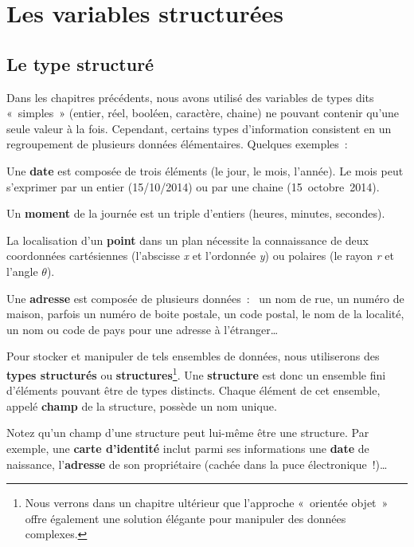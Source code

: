 \chapter{Les variables structurées}

\section{Le type structuré}

	Dans les chapitres précédents, nous avons utilisé des variables de types
	dits «~simples~» (entier, réel, booléen, caractère, chaine) ne pouvant
	contenir qu’une seule valeur à la fois. Cependant, certains types
	d’information consistent en un regroupement de plusieurs données
	élémentaires. Quelques exemples~:

	\begin{liste}
	\item
		Une \textbf{date} est composée de trois éléments (le jour, le mois,
		l’année). Le mois peut s'exprimer par un entier (15/10/2014) 
		ou par une chaine (15~octobre~2014).
	\item
		Un \textbf{moment} de la journée est un triple d’entiers 
		(heures, minutes, secondes).
	\item
		La localisation d’un \textbf{point} dans un plan 
		nécessite la connaissance de deux coordonnées cartésiennes 
		(l’abscisse \textit{x} et l’ordonnée \textit{y}) 
		ou polaires 
		(le rayon \textit{r} et l’angle \textit{$\theta$}).
	\item
		Une \textbf{adresse} est composée de plusieurs données~:~
		un nom de rue, 
		un numéro de maison, 
		parfois un numéro de boite postale, 
		un code postal, 
		le nom de la localité, 
		un nom ou code de pays pour une adresse à l’étranger\dots
	\end{liste}

	Pour stocker et manipuler de tels ensembles de données, nous utiliserons
	des \textbf{types structurés} ou \textbf{structures}\footnote{Nous
	verrons dans un chapitre ultérieur que l’approche
	«~orientée objet~» offre également une solution élégante pour manipuler
	des données complexes.}. Une \textbf{structure} est donc un ensemble
	fini d’éléments pouvant être de types distincts. Chaque élément de cet
	ensemble, appelé \textbf{champ} de la structure, possède un nom unique.
	
	Notez qu’un champ d’une structure peut lui-même être une structure. Par
	exemple, une \textbf{carte d’identité} inclut parmi ses informations
	une \textbf{date} de naissance, l’\textbf{adresse} de son
	propriétaire (cachée dans la puce électronique~!)\dots

